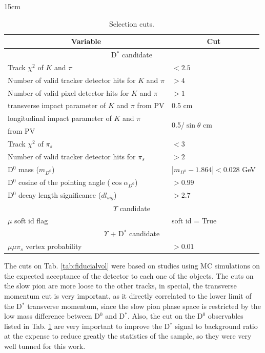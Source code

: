 \begin{table}[!htbp]{15cm}
  \caption{Selection cuts.}
  \begin{tabular}{ l | l }
    \hline
    \multicolumn{1}{c|}{Variable} & \multicolumn{1}{|c}{Cut} \\ \hline
    \multicolumn{2}{c}{D$^*$ candidate} \\ \hline
    Track $\chi^2$ of $K$ and $\pi$ & $< 2.5$ \\ \hline
    Number of valid tracker detector hits for $K$ and $\pi$ & $> 4$ \\ \hline
    Number of valid pixel detector hits for $K$ and $\pi$ & $> 1$ \\ \hline
    transverse impact parameter of $K$ and $\pi$ from PV & 0.5 cm \\ \hline
    longitudinal impact parameter of $K$ and $\pi$ & \multirow[c]{2}{*}{0.5/$\sin{\theta}$ cm} \\
    from PV & \\ \hline
    Track $\chi^2$ of $\pi_s$ & $< 3$ \\ \hline
    Number of valid tracker detector hits for $\pi_s$ & $> 2$\\ \hline
    D$^0$ mass ($m_{D^0}$) & $|m_{D^0} - 1.864| < 0.028$ GeV \\ \hline
    D$^0$ cosine of the pointing angle ($\cos{\alpha_{D^0}}$) & $> 0.99$ \\ \hline
    D$^0$ decay length significance ($dl_{sig}$) & $> 2.7$ \\ \hline
    
    \multicolumn{2}{c}{$\Upsilon$ candidate} \\ \hline
    $\mu$ soft id flag & soft id = True \\ \hline

    \multicolumn{2}{c}{$\Upsilon$ + D$^*$ candidate} \\ \hline
    $\mu\mu\pi_s$ vertex probability & $> 0.01$ \\ \hline

  \end{tabular}
  \label{tab:selectioncuts}
\end{table}

The cuts on Tab. \ref{tab:fiducialvol} were based on studies using MC simulations on the expected acceptance of the detector to each one of the objects. The cuts on the slow pion are more loose to the other tracks, in special, the transverse momentum cut is very important, as it directly correlated to the lower limit of the D$^*$ transverse momentum, since the slow pion phase space is restricted by the low mass difference between D$^0$ and D$^*$. Also, the cut on the D$^0$ observables listed in Tab. \ref{tab:selectioncuts} are very important to improve the D$^*$ signal to background ratio at the expense to reduce greatly the statistics of the sample, so they were very well tunned for this work. 

